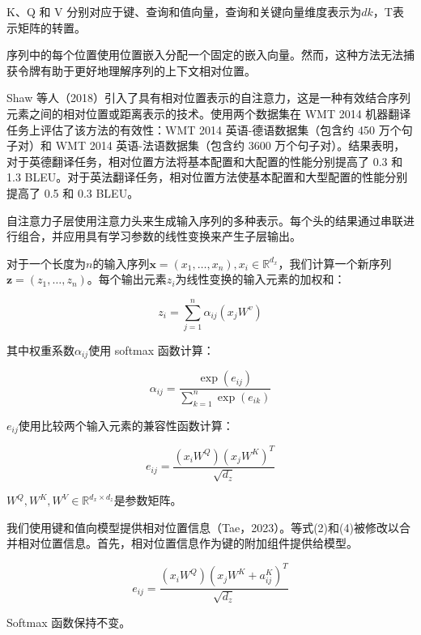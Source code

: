 K、Q 和 V 分别对应于键、查询和值向量，查询和关键向量维度表示为$dk$，T表示矩阵的转置。

序列中的每个位置使用位置嵌入分配一个固定的嵌入向量。然而，这种方法无法捕获令牌有助于更好地理解序列的上下文相对位置。

Shaw 等人（2018）引入了具有相对位置表示的自注意力，这是一种有效结合序列元素之间的相对位置或距离表示的技术。使用两个数据集在 WMT 2014 机器翻译任务上评估了该方法的有效性：WMT 2014 英语-德语数据集（包含约 450 万个句子对）和 WMT 2014 英语-法语数据集（包含约 3600 万个句子对）。结果表明，对于英德翻译任务，相对位置方法将基本配置和大配置的性能分别提高了 0.3 和 1.3 BLEU。对于英法翻译任务，相对位置方法使基本配置和大型配置的性能分别提高了 0.5 和 0.3 BLEU。

自注意力子层使用注意力头来生成输入序列的多种表示。每个头的结果通过串联进行组合，并应用具有学习参数的线性变换来产生子层输出。

对于一个长度为$n$的输入序列$\boldsymbol{x} = \left( x_1, \ldots, x_n \right), x_i \in \mathbb{R}^{d_x}$，我们计算一个新序列$\boldsymbol{z} = \left( z_1, \ldots, z_n \right)$。每个输出元素$z_i$为线性变换的输入元素的加权和：

\begin{equation}
  z_i = \sum_{j=1}^n \alpha_{ij} \left( x_jW^{v} \right) 
\end{equation}

其中权重系数$\alpha_{ij}$使用 softmax 函数计算：

\begin{equation}
  \alpha_{ij} = \frac{\exp \left( e_{ij} \right)}{\sum_{k=1}^n \exp \left( e_{ik} \right)}
\end{equation}

$e_{ij}$使用比较两个输入元素的兼容性函数计算：

\begin{equation}
  e_{ij} = \frac{\left( x_iW^{Q} \right) \left( x_jW^{K} \right)^T}{\sqrt{d_z}}
\end{equation}

$W^Q, W^K, W^V \in \mathbb{R}^{d_x  \times d_z}$是参数矩阵。

我们使用键和值向模型提供相对位置信息（Tae，2023）。等式(2)和(4)被修改以合并相对位置信息。首先，相对位置信息作为键的附加组件提供给模型。

\begin{equation}
  e_{ij} = \frac{\left( x_iW^{Q} \right) \left( x_jW^{K} + a_{ij}^K \right)^T}{\sqrt{d_z}}
\end{equation}

Softmax 函数保持不变。

